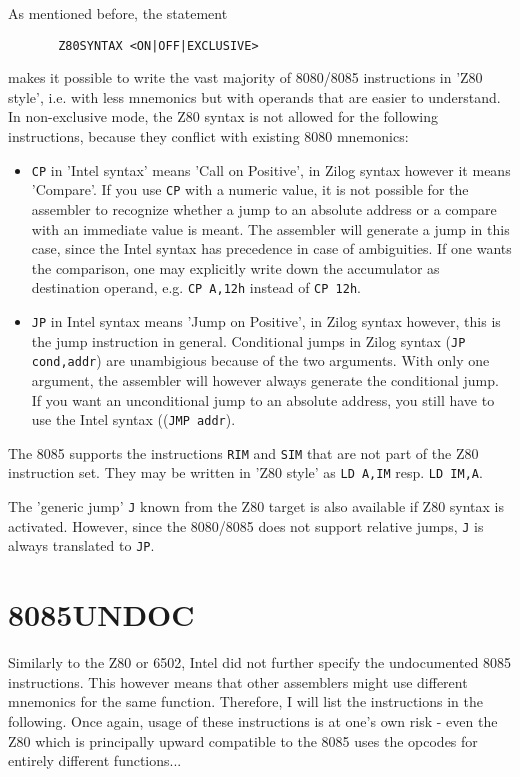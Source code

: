 \documentclass[12pt,twoside]{report}
\newcommand{\tty}[1]{{\tt #1}}
\begin{document}
As mentioned before, the statement
\begin{verbatim}
       Z80SYNTAX <ON|OFF|EXCLUSIVE>
\end{verbatim}
makes it possible to write the vast majority of 8080/8085
instructions in 'Z80 style', i.e. with less mnemonics but with
operands that are easier to understand.  In non-exclusive mode,
the Z80 syntax is not allowed for the following instructions,
because they conflict with existing 8080 mnemonics:
\begin{itemize}
\item{\tty{CP} in 'Intel syntax' means 'Call on Positive', in
      Zilog syntax however it means 'Compare'.  If you use
      \tty{CP} with a numeric value, it is not possible for the
      assembler to recognize whether a jump to an absolute
      address or a compare with an immediate value is meant.
      The assembler will generate a jump in this case, since the
      Intel syntax has precedence in case of ambiguities. If
      one wants the comparison, one may explicitly write down the
      accumulator as destination operand, e.g. \tty{CP A,12h}
      instead of \tty{CP 12h}.}
\item{\tty{JP} in Intel syntax means 'Jump on Positive', in Zilog
      syntax however, this is the jump instruction in general.
      Conditional jumps in Zilog syntax (\tty{JP cond,addr}) are
      unambigious because of the two arguments.  With only one
      argument, the assembler will however always generate the
      conditional jump.  If you want an unconditional jump to
      an absolute address, you still have to use the Intel syntax
      ((\tty{JMP addr}).}
\end{itemize}
The 8085 supports the instructions \tty{RIM} and \tty{SIM} that are
not part of the Z80 instruction set.  They may be written in 'Z80 style'
as \tty{LD A,IM} resp. \tty{LD IM,A}.
\par
The 'generic jump' {\tt J} known from the Z80 target is also 
available if Z80 syntax is activated.  However, since the 8080/8085
does not support relative jumps, {\tt J} is always translated to
{\tt JP}.


\section{8085UNDOC}
\label{8085Spec}

Similarly to the Z80 or 6502, Intel did not further specify the
undocumented 8085 instructions.  This however means that other assemblers
might use different mnemonics for the same function.  Therefore, I will
list the instructions in the following.  Once again, usage of these
instructions is at one's own risk - even the Z80 which is principally
upward compatible to the 8085 uses the opcodes for entirely different
functions...
\end{document}
